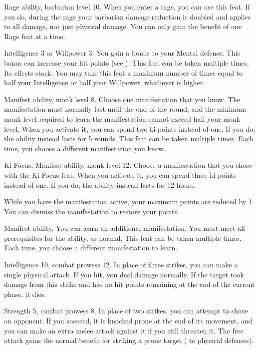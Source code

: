 \featpre Rage ability, barbarian level 10.
\featben When you enter a rage, you can use this feat. If you do, during the rage your barbarian damage reduction is doubled and applies to all damage, not just physical damage.
 You can only gain the benefit of one Rage feat at a time.

\featpre Intelligence 3 or Willpower 3.
\featben You gain a  bonus to your Mental defense.
This bonus can increase your hit points (see ).
 This feat can be taken multiple times. Its effects stack.
You may take this feat a maximum number of times equal to half your Intelligence or half your Willpower, whichever is higher.

\featpre Manifest \ki ability, monk level 8.
\featben Choose one \ki manifestation that you know.
The manifestation must normally last until the end of the round, and the minimum monk level required to learn the manifestation cannot exceed half your monk level.
When you activate it, you can spend two ki points instead of one.
If you do, the ability instead lasts for 5 rounds.
 This feat can be taken multiple times.
Each time, you choose a different \ki manifestation you know.

\featpre Ki Focus, Manifest \ki ability, monk level 12.
\featben Choose a \ki manifestation that you chose with the Ki Focus feat.
When you activate it, you can spend three ki points instead of one.
If you do, the ability instead lasts for 12 hours.

While you have the manifestation active, your maximum \ki points are reduced by 1.
You can dismiss the manifestation to restore your \ki points.

\featpre Manifest \ki ability.
\featben You can learn an additional \ki manifestation.
You must meet all prerequisites for the ability, as normal.
 This feat can be taken multiple times.
Each time, you choose a different \ki manifestation to learn.

\featpres Intelligence 10, combat prowess 12.
\featben In place of three strikes, you can make a single physical attack.
If you hit, you deal damage normally.
If the target took damage from this strike and has no hit points remaining at the end of the current phase, it dies.

\featpre Strength 5, combat prowess 8.
\featben In place of two strikes, you can attempt to shove an opponent.
If you succeed, it is knocked prone at the end of its movement, and you can make an extra melee attack against it if you still threaten it.
The free attack gains the normal benefit for striking a prone target ( to physical defenses).

